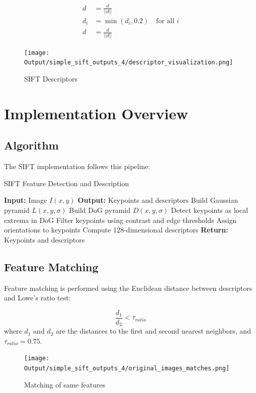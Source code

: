 \documentclass[12pt,a4paper]{article}
\begin{document}
\begin{align}
d &= \frac{d}{||d||} \\
d_i &= \min(d_i, 0.2) \quad \text{for all } i \\
d &= \frac{d}{||d||}
\end{align}

\begin{figure}[!ht]
    \centering
    \texttt{[image: Output/simple\_sift\_outputs\_4/descriptor\_visualization.png]}
    \caption{SIFT Descriptors}
    \label{fig:fig5}
\end{figure}

\section{Implementation Overview}

\subsection{Algorithm}

The SIFT implementation follows this pipeline:

\begin{algorithm}
\caption{SIFT Feature Detection and Description}
\begin{algorithmic}[1]
\STATE \textbf{Input:} Image $I(x,y)$
\STATE \textbf{Output:} Keypoints and descriptors
\STATE Build Gaussian pyramid $L(x,y,\sigma)$
\STATE Build DoG pyramid $D(x,y,\sigma)$
\STATE Detect keypoints as local extrema in DoG
\STATE Filter keypoints using contrast and edge thresholds
\STATE Assign orientations to keypoints
\STATE Compute 128-dimensional descriptors
\STATE \textbf{Return:} Keypoints and descriptors
\end{algorithmic}
\end{algorithm}

\subsection{Feature Matching}

Feature matching is performed using the Euclidean distance between descriptors and Lowe's ratio test:

\begin{equation}
\frac{d_1}{d_2} < \tau_{ratio}
\end{equation}
where $d_1$ and $d_2$ are the distances to the first and second nearest neighbors, and $\tau_{ratio} = 0.75$.

\begin{figure}[!ht]
    \centering
    \texttt{[image: Output/simple\_sift\_outputs\_4/original\_images\_matches.png]}
    \caption{Matching of same features}
    \label{fig:fig6}
\end{figure}
\end{document}
